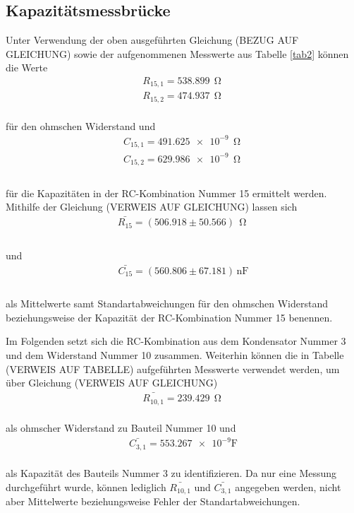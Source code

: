\subsection{Kapazitätsmessbrücke}

Unter Verwendung der oben ausgeführten Gleichung (BEZUG AUF GLEICHUNG) sowie der aufgenommenen
Messwerte aus Tabelle \ref{tab2} können die Werte 
\begin{align}
R_{15,1} = 538.899\,\upOmega \nonumber \\
R_{15,2} = 474.937\,\upOmega \nonumber  
\end{align}
\\
für den ohmschen Widerstand und
\begin{align}
C_{15,1} = \num{491.625e-9}\,\upOmega \nonumber \\
C_{15,2} = \num{629.986e-9}\,\upOmega \nonumber \\ 
\end{align}
\\
für die Kapazitäten in der RC-Kombination Nummer 15 ermittelt werden. Mithilfe der Gleichung (VERWEIS AUF GLEICHUNG)
lassen sich 
\begin{align}
\bar{R_{15}} = (506.918 \pm 50.566)\, \upOmega \nonumber \\
\end{align}
\\
und
\begin{align}
\bar{C_{15}} = (560.806 \pm 67.181)\, \si{\nano\farad} \nonumber \\
\end{align}
\\
als Mittelwerte samt Standartabweichungen für den ohmschen Widerstand beziehungsweise der
Kapazität der RC-Kombination Nummer 15 benennen.



Im Folgenden setzt sich die RC-Kombination aus dem Kondensator Nummer 3 und dem Widerstand Nummer 10 zusammen. Weiterhin 
können die in Tabelle (VERWEIS AUF TABELLE) aufgeführten Messwerte verwendet werden, um über Gleichung
(VERWEIS AUF GLEICHUNG) 
\begin{align}
\bar{R_{10,1}} = 239.429\, \upOmega \nonumber
\end{align}
\\
als ohmscher Widerstand zu Bauteil Nummer 10 und
\begin{align}
\bar{C_{3,1}} = \num{553.267e-9} \si{\farad} \nonumber
\end{align}
\\
als Kapazität des Bauteils Nummer 3 zu identifizieren. Da nur eine Messung durchgeführt wurde, können lediglich $\bar{R_{10,1}}$
und $\bar{C_{3,1}}$ angegeben werden, nicht aber Mittelwerte beziehungsweise Fehler der Standartabweichungen.


